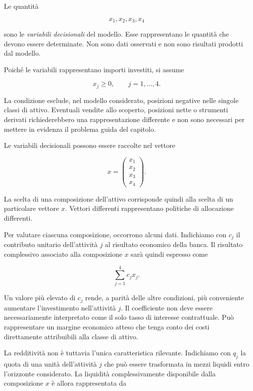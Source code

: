 Le quantit\`a

\[
x_1,x_2,x_3,x_4
\]

\noindent sono le \emph{variabili decisionali} del modello. Esse rappresentano le
quantit\`a che devono essere determinate. Non sono dati osservati e non sono
risultati prodotti dal modello.

Poich\'e le variabili rappresentano importi investiti, si assume

\[
x_j\geq 0,
\qquad
j=1,\ldots,4.
\]

La condizione esclude, nel modello considerato, posizioni negative nelle
singole classi di attivo. Eventuali vendite allo scoperto, posizioni nette o
strumenti derivati richiederebbero una rappresentazione differente e non sono
necessari per mettere in evidenza il problema guida del capitolo.

Le variabili decisionali possono essere raccolte nel vettore

\[
x
=
\begin{pmatrix}
x_1\\
x_2\\
x_3\\
x_4
\end{pmatrix}.
\]

La scelta di una composizione dell'attivo corrisponde quindi alla scelta di un
particolare vettore $x$. Vettori differenti rappresentano politiche di
allocazione differenti.

Per valutare ciascuna composizione, occorrono alcuni dati. Indichiamo con
$c_j$ il contributo unitario dell'attivit\`a $j$ al risultato economico della
banca. Il risultato complessivo associato alla composizione $x$ sar\`a quindi
espresso come

\[
\sum_{j=1}^{4}c_jx_j.
\]

Un valore pi\`u elevato di $c_j$ rende, a parit\`a delle altre condizioni,
pi\`u conveniente aumentare l'investimento nell'attivit\`a $j$. Il
coefficiente non deve essere necessariamente interpretato come il solo tasso
di interesse contrattuale. Pu\`o rappresentare un margine economico atteso
che tenga conto dei costi direttamente attribuibili alla classe di attivo.

La redditivit\`a non \`e tuttavia l'unica caratteristica rilevante. Indichiamo
con $q_j$ la quota di una unit\`a dell'attivit\`a $j$ che pu\`o essere
trasformata in mezzi liquidi entro l'orizzonte considerato. La liquidit\`a
complessivamente disponibile dalla composizione $x$ \`e allora rappresentata
da

